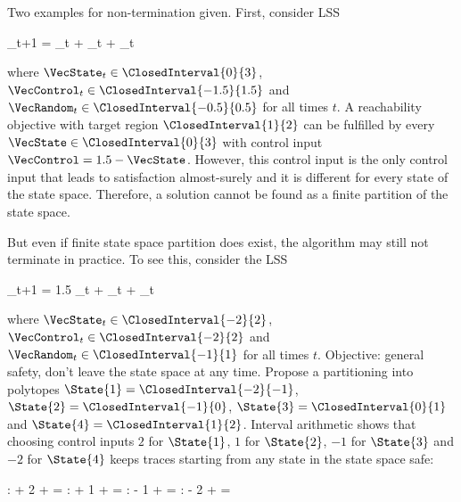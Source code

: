     Two examples for non-termination given.
    First, consider LSS

    \startformula
        \VecState_{t+1} = \VecState_t + \VecControl_t + \VecRandom_t
    \stopformula

    where $\VecState_t \in \ClosedInterval{0}{3}$, $\VecControl_t \in \ClosedInterval{-1.5}{1.5}$ and $\VecRandom_t \in \ClosedInterval{-0.5}{0.5}$ for all times $t$.
    A reachability objective with target region $\ClosedInterval{1}{2}$ can be fulfilled by every $\VecState \in \ClosedInterval{0}{3}$ with control input $\VecControl = 1.5 - \VecState$.
    However, this control input is the only control input that leads to satisfaction almost-surely and it is different for every state of the state space.
    Therefore, a solution cannot be found as a finite partition of the state space.

    But even if finite state space partition does exist, the algorithm may still not terminate in practice.
    To see this, consider the LSS

    \startformula
        \VecState_{t+1} = 1.5 \VecState_t + \VecControl_t + \VecRandom_t
    \stopformula

    where $\VecState_t \in \ClosedInterval{-2}{2}$, $\VecControl_t \in \ClosedInterval{-2}{2}$ and $\VecRandom_t \in \ClosedInterval{-1}{1}$ for all times $t$.
    Objective: general safety, don't leave the state space at any time.
    Propose a partitioning into polytopes $\State{1} = \ClosedInterval{-2}{-1}$, $\State{2} = \ClosedInterval{-1}{0}$, $\State{3} = \ClosedInterval{0}{1}$ and $\State{4} = \ClosedInterval{1}{2}$.
    Interval arithmetic shows that choosing control inputs $2$ for $\State{1}$, $1$ for $\State{2}$, $-1$ for $\State{3}$ and $-2$ for $\State{4}$ keeps traces starting from any state in the state space safe:

    \startformula
        \startalign[n=4,align={right,right,left,left}]
            \NC {}:
             \cdot {} + 2 + 
            \NC = 
            \NC \subseteq \StateSpace
            \NR
            \NC {}:
             \cdot {} + 1 + 
            \NC = 
            \NC \subseteq \StateSpace
            \NR
            \NC {}:
             \cdot {} - 1 + 
            \NC = 
            \NC \subseteq \StateSpace
            \NR
            \NC {}:
             \cdot {} - 2 + 
            \NC = 
            \NC \subseteq \StateSpace \EndPeriod
            \NR
        \stopalign
    \stopformula

